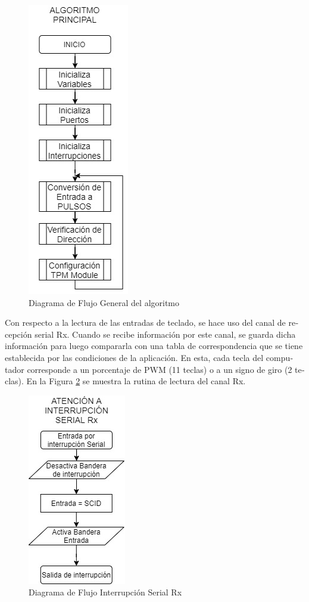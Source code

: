 \documentclass[journal]{IEEEtran}
\begin{document}
\begin{otherlanguage}{spanish}
\begin{figure}[H]
    \centering
    \includegraphics[scale=.6]{Imágenes/Practica 6.2.jpg}
    \caption{Diagrama de Flujo General del algoritmo}
    \label{DDF_General}
\end{figure}

Con respecto a la lectura de las entradas de teclado, se hace uso del canal de recepción serial Rx. Cuando se recibe información por este canal, se guarda dicha información para luego compararla con una tabla de correspondencia que se tiene establecida por las condiciones de la aplicación. En esta, cada tecla del computador corresponde a un porcentaje de PWM (11 teclas) o a un signo de giro (2 teclas). En la Figura \ref{DDF_Serial} se muestra la rutina de lectura del canal Rx.

\begin{figure}[H]
    \centering
    \includegraphics[scale=.6]{Imágenes/Practica 6.1.jpg}
    \caption{Diagrama de Flujo Interrupción Serial Rx}
    \label{DDF_Serial}
\end{figure}


\end{otherlanguage}
\end{document}
